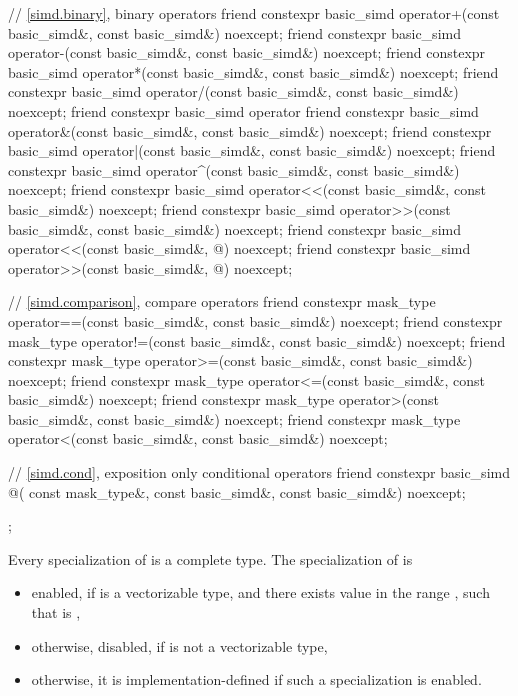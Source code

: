 \begin{codeblock}
{  // \ref{simd.binary},  binary operators
  friend constexpr basic_simd operator+(const basic_simd&, const basic_simd&) noexcept;
  friend constexpr basic_simd operator-(const basic_simd&, const basic_simd&) noexcept;
  friend constexpr basic_simd operator*(const basic_simd&, const basic_simd&) noexcept;
  friend constexpr basic_simd operator/(const basic_simd&, const basic_simd&) noexcept;
  friend constexpr basic_simd operator%
  friend constexpr basic_simd operator&(const basic_simd&, const basic_simd&) noexcept;
  friend constexpr basic_simd operator|(const basic_simd&, const basic_simd&) noexcept;
  friend constexpr basic_simd operator^(const basic_simd&, const basic_simd&) noexcept;
  friend constexpr basic_simd operator<<(const basic_simd&, const basic_simd&) noexcept;
  friend constexpr basic_simd operator>>(const basic_simd&, const basic_simd&) noexcept;
  friend constexpr basic_simd operator<<(const basic_simd&, @\simdsizetype@) noexcept;
  friend constexpr basic_simd operator>>(const basic_simd&, @\simdsizetype@) noexcept;

  // \ref{simd.comparison},  compare operators
  friend constexpr mask_type operator==(const basic_simd&, const basic_simd&) noexcept;
  friend constexpr mask_type operator!=(const basic_simd&, const basic_simd&) noexcept;
  friend constexpr mask_type operator>=(const basic_simd&, const basic_simd&) noexcept;
  friend constexpr mask_type operator<=(const basic_simd&, const basic_simd&) noexcept;
  friend constexpr mask_type operator>(const basic_simd&, const basic_simd&) noexcept;
  friend constexpr mask_type operator<(const basic_simd&, const basic_simd&) noexcept;

  // \ref{simd.cond},  exposition only conditional operators
  friend constexpr basic_simd @\simdselect@(
    const mask_type&, const basic_simd&, const basic_simd&) noexcept;
};
\end{codeblock}

\pnum
Every specialization of  is a complete type.
The specialization of  is
\begin{itemize}
  \item enabled, if  is a vectorizable type, and there exists value  in the range
    , such that  is ,
  \item otherwise, disabled, if  is not a vectorizable type,
  \item otherwise, it is implementation-defined if such a specialization is enabled.
\end{itemize}

